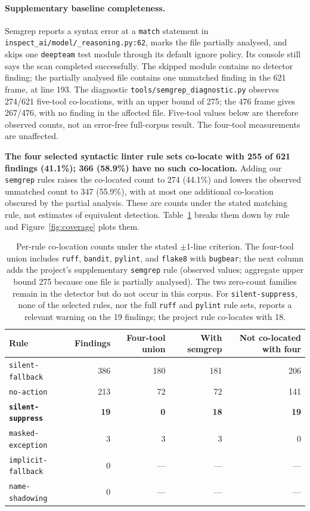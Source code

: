 \documentclass[10pt,a4paper]{article}
\begin{document}
\paragraph{Supplementary baseline completeness.}
Semgrep reports a syntax error at a \texttt{match} statement in
\texttt{inspect\_ai/model/\_reasoning.py:62}, marks the file partially analysed,
and skips one \texttt{deepteam} test module through its default ignore policy.
Its console still says the scan completed successfully. The skipped module
contains no detector finding; the partially analysed file contains one
unmatched finding in the 621 frame, at line 193. The diagnostic
\texttt{tools/semgrep\_diagnostic.py} observes 274/621 five-tool co-locations,
with an upper bound of 275; the 476 frame gives 267/476, with no finding in
the affected file. Five-tool values below are therefore observed counts,
not an error-free full-corpus result. The four-tool measurements are unaffected.

\textbf{The four selected syntactic linter rule sets co-locate with 255 of 621
findings (41.1\%); 366 (58.9\%) have no such co-location.} Adding our
\texttt{semgrep} rules raises the co-located count to 274 (44.1\%) and lowers the
observed unmatched count to 347 (55.9\%), with at most one additional
co-location obscured by the partial analysis. These are counts under the
stated matching rule, not estimates of equivalent detection. Table~\ref{tab:coverage}
breaks them down by rule and Figure~\ref{fig:coverage} plots them.

\begin{table}[htbp]
\centering\small
\caption{Per-rule co-location counts under the stated $\pm$1-line criterion.
The four-tool union includes \texttt{ruff}, \texttt{bandit}, \texttt{pylint},
and \texttt{flake8} with \texttt{bugbear}; the next column adds the project's
supplementary \texttt{semgrep} rule (observed values; aggregate upper bound
275 because one file is partially analysed). The two zero-count families remain in the
detector but do not occur in this corpus. For \texttt{silent-suppress}, none of
the selected rules, nor the full \texttt{ruff} and \texttt{pylint} rule sets,
reports a relevant warning on the 19 findings; the project rule co-locates with
18.}
\label{tab:coverage}
\begin{tabular}{@{}lrrrr@{}}
\toprule
Rule & Findings & Four-tool union & With semgrep & Not co-located with four \\
\midrule
\texttt{silent-fallback} & 386 & 180 & 181 & 206 \\
\texttt{no-action} & 213 & 72 & 72 & 141 \\
\textbf{\texttt{silent-suppress}} & \textbf{19} & \textbf{0}
& \textbf{18} & \textbf{19} \\
\texttt{masked-exception} & 3 & 3 & 3 & 0 \\
\texttt{implicit-fallback} & 0 & --- & --- & --- \\
\texttt{name-shadowing} & 0 & --- & --- & --- \\
\bottomrule
\end{tabular}
\end{table}
\end{document}
